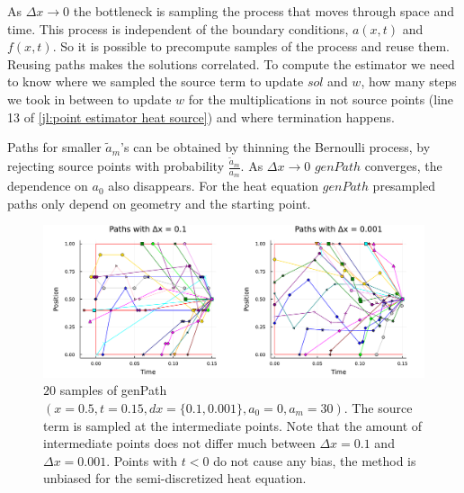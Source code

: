 \documentclass[a4paper,12pt]{article}
\begin{document}
\begin{technique} \label{tech:presampling heat}
  As $\Delta x \rightarrow 0$ the bottleneck is sampling the process that moves through space and time.
  This process is independent of the boundary conditions, $a(x,t)$ and $f(x,t)$. So it is possible to
  precompute samples of the process and reuse them.
  Reusing paths makes the solutions correlated. To compute the estimator we need to know where we sampled the
  source term to update $sol$ and $w$, how many steps we took in between to update $w$ for the
  multiplications in not source points (line 13 of \ref{jl:point estimator heat source})
  and where termination happens.


  Paths for smaller $\tilde{a}_{m}$'s can be obtained by thinning the Bernoulli process,
  by rejecting source points with probability $\frac{\tilde{a}_{m}}{a_{m}}$. As $\Delta x \rightarrow 0$
  $genPath$ converges, the dependence on $a_{0}$ also disappears. For the heat equation
  $genPath$ presampled paths only depend on geometry and the starting point.

  \begin{figure}[h!]
    \centering
    \includegraphics[width=\textwidth]{./julia_plots/paths_pest_heat_varcoef.pdf}
    \caption{$20$ samples of genPath$(x=0.5,t=0.15,dx=\{0.1,0.001\},a_{0}=0,a_{m} = 30)$. The source term is sampled
    at the intermediate points. Note that the amount of
    intermediate points does not differ much between $\Delta x = 0.1$ and $\Delta x = 0.001$.
    Points with $t<0$ do not cause any bias, the method is unbiased for the semi-discretized heat equation. }
    \label{fig:presampled paths pest heat var}
  \end{figure}

\end{technique}
\end{document}

